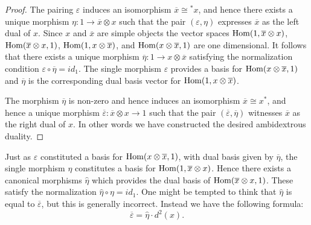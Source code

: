 \documentclass{amsart}
\begin{document}
\begin{proof}
	The pairing $\varepsilon$ induces an isomorphism $\overline{x} \cong {}^*x$, and hence there exists a unique morphism $\eta: 1 \to \overline{x} \otimes x$ such that the pair $(\varepsilon, \eta)$ expresses $\overline{x}$ as the left dual of $x$. Since $x$ and $\overline{x}$ are simple objects the vector spaces $\operatorname{Hom}(1, \overline{x} \otimes x)$, $\operatorname{Hom}(\overline{x} \otimes x, 1)$, $\operatorname{Hom}(1, x \otimes \overline{x})$, and $\operatorname{Hom}(x \otimes \overline{x}, 1)$ are one dimensional. It follows that there exists a unique morphism $\overline{\eta}: 1 \to x \otimes \overline{x}$ satisfying the normalization condition $\varepsilon \circ \overline{\eta} = id_1$. The single morphism $\varepsilon$ provides a basis for $\operatorname{Hom}(x \otimes \overline{x}, 1)$ and $\overline{\eta}$ is the corresponding dual basis vector for $\operatorname{Hom}(1, x \otimes \overline{x})$. 
	
	The morphism $\overline{\eta}$ is non-zero and hence induces an isomorphism $\overline{x} \cong x^*$, and hence a unique morphism $\overline{\varepsilon}: \overline{x} \otimes x \to 1$ such that the pair $(\overline{\varepsilon}, \overline{\eta})$ witnesses $\overline{x}$ as the right dual of $x$. In other words we have constructed the desired ambidextrous duality. 
\end{proof}

Just as $\varepsilon$ constituted a basis for $\operatorname{Hom}(x \otimes \overline{x}, 1)$, with dual basis given by $\overline{\eta}$, the single morphism $\eta$ constitutes a basis for $\operatorname{Hom}(1, \overline{x} \otimes x)$. Hence there exists a canonical morphisms $\hat{\eta}$ which provides the dual basis of $\operatorname{Hom}(\overline{x} \otimes x, 1)$. These satisfy the normalization $\hat{\eta} \circ \eta = id_1$. One might be tempted to think that $\hat{\eta}$ is equal to  $\overline{\varepsilon}$, but this is generally incorrect. Instead we have the following formula:
\begin{equation*}
	\overline{\varepsilon} = \hat{\eta} \cdot d^2(x).
\end{equation*} 

\end{document}
